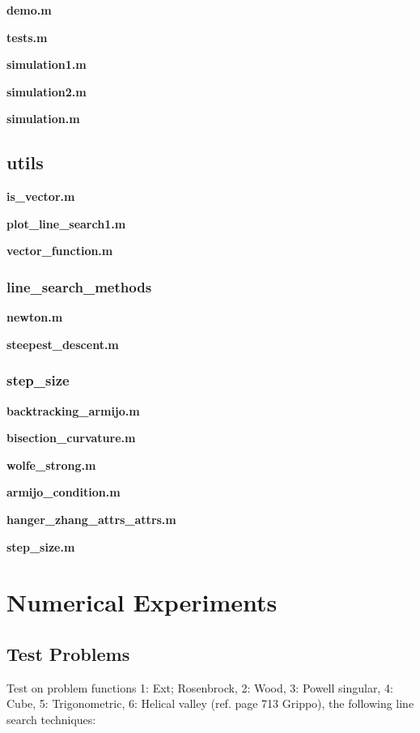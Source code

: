 \documentclass[a4paper,11pt]{article}
\numberwithin{equation}{section} %
\begin{document}
\textbf{demo.m}

% 
\textbf{tests.m}

\textbf{simulation1.m}

\textbf{simulation2.m}

\textbf{simulation.m}



\subsection{utils}
\textbf{is\_vector.m}

\textbf{plot\_line\_search1.m}

\textbf{vector\_function.m}


\subsubsection{line\_search\_methods}
\textbf{newton.m}

\textbf{steepest\_descent.m}


\subsubsection{step\_size}
\textbf{backtracking\_armijo.m}

\textbf{bisection\_curvature.m}

\textbf{wolfe\_strong.m}

\textbf{armijo\_condition.m}

\textbf{hanger\_zhang\_attrs\_attrs.m}

\textbf{step\_size.m}


\section{Numerical Experiments}

\subsection{Test Problems}


Test on problem functions 1: Ext; Rosenbrock, 2: Wood, 3: Powell singular, 4: Cube, 5: Trigonometric, 6: Helical valley (ref. page 713 Grippo), the following line search techniques:
    
\end{document}
